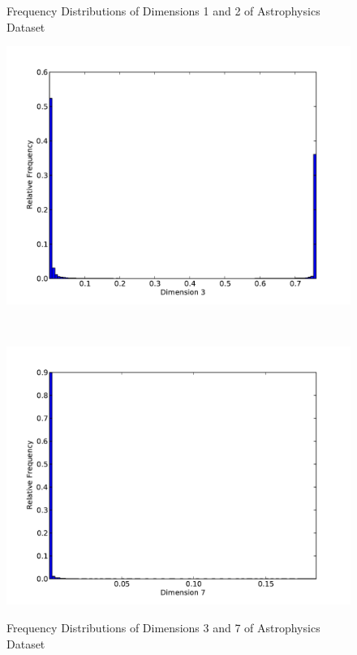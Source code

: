 \begin{figure}
	\caption{Frequency Distributions of Dimensions 1 and 2 of Astrophysics Dataset}
	\label{fig:astrophysics-histograms1}
\end{figure}

\begin{figure}
	\begin{center}
		\begin{subfloat}{%
			\includegraphics[scale=0.36]{figures/histograms/astrophysics_500000_2.pdf}
		}
		\end{subfloat}~
		\begin{subfloat}{%
			\includegraphics[scale=0.36]{figures/histograms/astrophysics_500000_6.pdf}
		}
		\end{subfloat}
	\end{center}

	\caption{Frequency Distributions of Dimensions 3 and 7 of Astrophysics Dataset}
	\label{fig:astrophysics-histograms2}
\end{figure}

